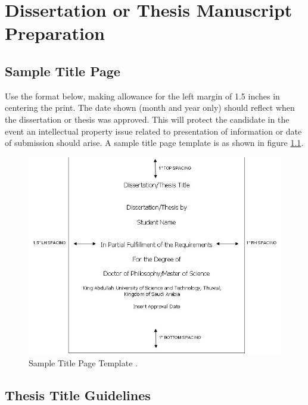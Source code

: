 

\chapter{Dissertation or Thesis Manuscript Preparation}
\label{chapter2}

\section{Sample Title Page}

Use the format below, making allowance for the left margin of 1.5 inches in centering the print. The date shown (month and year only) should reflect when the dissertation or thesis was approved. This will protect the candidate in the event an intellectual property issue related to presentation of information or date of submission should arise. A sample title page template is as shown in figure \ref{title_page}.

\begin{figure}[H]
\begin{center}
\includegraphics[scale=0.85]{Figures/Title_Page.jpg}
\caption{Sample Title Page Template \cite{guidelines}.}
\label{title_page}
\end{center}
\end{figure}

\section{Thesis Title Guidelines}

